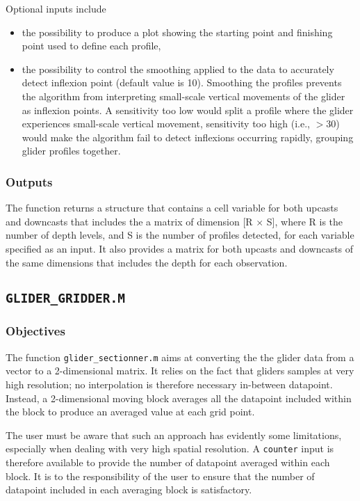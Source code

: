 \documentclass[11pt,A4]{report}
\begin{document}
Optional inputs include 
\begin{itemize}
\item the possibility to produce a plot showing the starting point and finishing point used to define each profile,
\item the possibility to control the smoothing applied to the data to accurately detect inflexion point (default value is 10). Smoothing the profiles prevents the algorithm from interpreting small-scale vertical movements of the glider as inflexion points. A sensitivity too low would split a profile where the glider experiences small-scale vertical movement,  sensitivity too high (i.e., $>$30) would make the algorithm fail to detect inflexions occurring rapidly, grouping glider profiles together.
\end{itemize}

\subsubsection{Outputs}

The function returns a structure that contains a cell variable for both upcasts and downcasts that includes the a matrix of dimension [R $\times$ S], where R is the number of depth levels, and S is the number of profiles detected, for each variable specified as an input. It also provides a matrix for both upcasts and downcasts of the same dimensions that includes the depth for each observation.

\subsection{\texttt{GLIDER\_GRIDDER.M}}
\subsubsection{Objectives}
The function \texttt{glider\_sectionner.m} aims at converting the the glider data from a vector to a 2-dimensional matrix. It relies on the fact that gliders samples at very high resolution; no interpolation is therefore necessary in-between datapoint. Instead, a 2-dimensional moving block averages all the datapoint included within the block to produce an averaged value at each grid point.

The user must be aware that such an approach has evidently some limitations, especially when dealing with very high spatial resolution. A \texttt{counter} input is therefore available to provide the number of datapoint averaged within each block. It is to the responsibility of the user to ensure that the number of datapoint included in each averaging block is satisfactory.
\end{document}
